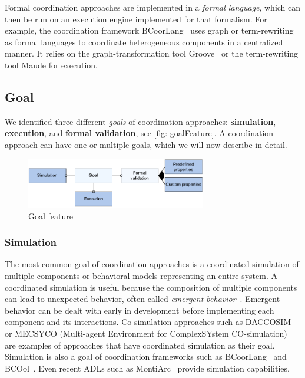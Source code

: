 \documentclass[runningheads]{llncs}
\begin{document}
Formal coordination approaches are implemented in a \textit{formal language}, which can then be run on an execution engine implemented for that formalism.
For example, the coordination framework BCoorLang~\cite{krauterBehavioralConsistencyMultimodeling2023} uses graph or term-rewriting as formal languages to coordinate heterogeneous components in a centralized manner.
It relies on the graph-transformation tool Groove~\cite{rensinkGROOVESimulatorTool2004} or the term-rewriting tool Maude for execution.


\subsection{Goal} %
We identified three different \textit{goals} of coordination approaches: \textbf{simulation}, \textbf{execution}, and \textbf{formal validation}, see \autoref{fig: goalFeature}.
A coordination approach can have one or multiple goals, which we will now describe in detail.

\begin{figure}[ht]
	\centering
	\includegraphics[width=0.7\textwidth]{images/goal_feature}
	\caption{Goal feature}
	\label{fig: goalFeature}
\end{figure}

\subsubsection{Simulation} The most common goal of coordination approaches is a coordinated simulation of multiple components or behavioral models representing an entire system.
A coordinated simulation is useful because the composition of multiple components can lead to unexpected behavior, often called \textit{emergent behavior}~\cite{ekerTamingHeterogeneityPtolemy2003}.
Emergent behavior can be dealt with early in development before implementing each component and its interactions.
Co-simulation approaches such as DACCOSIM~\cite{galtierFMIBasedDistributedMultisimulation2015,dadSynthesisFeedbackDistribution2021} or MECSYCO (Multi-agent Environment for ComplexSYstem CO-simulation)~\cite{camusHybridCosimulationFMUs2016,camusCosimulationCyberphysicalSystems2018} are examples of approaches that have coordinated simulation as their goal.
Simulation is also a goal of coordination frameworks such as BCoorLang~\cite{krauterBehavioralConsistencyMultimodeling2023} and BCOol~\cite{varalarsenBehavioralCoordinationOperator2015}.
Even recent ADLs such as MontiArc~\cite{haberMontiArcArchitecturalModeling2014} provide simulation capabilities.
\end{document}
